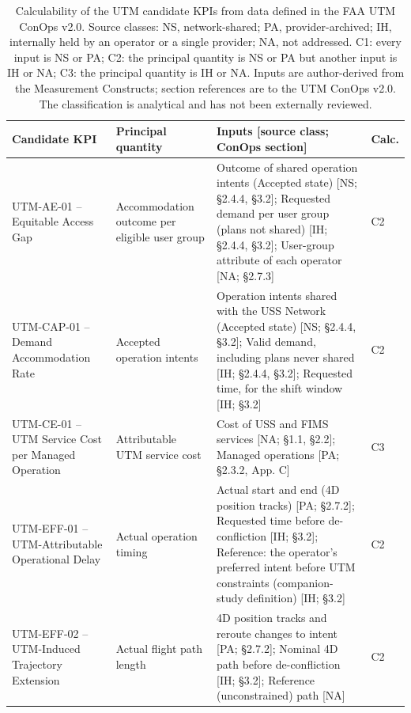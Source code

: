 \begin{table}[!t]
\caption{Calculability of the UTM candidate KPIs from data defined in the FAA UTM ConOps v2.0. Source classes: NS, network-shared; PA, provider-archived; IH, internally held by an operator or a single provider; NA, not addressed. C1: every input is NS or PA; C2: the principal quantity is NS or PA but another input is IH or NA; C3: the principal quantity is IH or NA. Inputs are author-derived from the Measurement Constructs; section references are to the UTM ConOps v2.0. The classification is analytical and has not been externally reviewed.}
\label{tab:calc-utm}
\centering
\footnotesize
\renewcommand{\arraystretch}{1.12}
\begin{tabularx}{\textwidth}{@{}>{\raggedright\arraybackslash}p{}>{\raggedright\arraybackslash}p{}>{\raggedright\arraybackslash}X>{\centering\arraybackslash}p{}@{}}
\toprule
\textbf{Candidate KPI} & \textbf{Principal quantity} & \textbf{Inputs [source class; ConOps section]} & \textbf{Calc.} \\
\midrule
UTM-AE-01 -- Equitable Access Gap & Accommodation outcome per eligible user group & Outcome of shared operation intents (Accepted state) [NS; \S{}2.4.4, \S{}3.2]; Requested demand per user group (plans not shared) [IH; \S{}2.4.4, \S{}3.2]; User-group attribute of each operator [NA; \S{}2.7.3] & C2 \\
UTM-CAP-01 -- Demand Accommodation Rate & Accepted operation intents & Operation intents shared with the USS Network (Accepted state) [NS; \S{}2.4.4, \S{}3.2]; Valid demand, including plans never shared [IH; \S{}2.4.4, \S{}3.2]; Requested time, for the shift window [IH; \S{}3.2] & C2 \\
UTM-CE-01 -- UTM Service Cost per Managed Operation & Attributable UTM service cost & Cost of USS and FIMS services [NA; \S{}1.1, \S{}2.2]; Managed operations [PA; \S{}2.3.2, App. C] & C3 \\
UTM-EFF-01 -- UTM-Attributable Operational Delay & Actual operation timing & Actual start and end (4D position tracks) [PA; \S{}2.7.2]; Requested time before de-confliction [IH; \S{}3.2]; Reference: the operator's preferred intent before UTM constraints (companion-study definition) [IH; \S{}3.2] & C2 \\
UTM-EFF-02 -- UTM-Induced Trajectory Extension & Actual flight path length & 4D position tracks and reroute changes to intent [PA; \S{}2.7.2]; Nominal 4D path before de-confliction [IH; \S{}3.2]; Reference (unconstrained) path [NA] & C2 \\

\end{tabularx}
\end{table}

